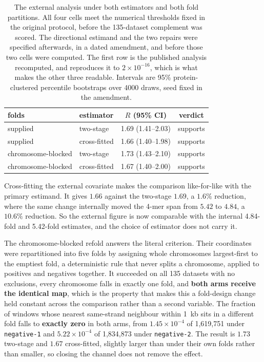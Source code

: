 \begin{table}[htbp]
\centering
\caption{The external analysis under both estimators and both fold partitions. All four cells
meet the numerical thresholds fixed in the original protocol, before the 135-dataset
complement was scored. The directional estimand and the two repairs were specified afterwards,
in a dated amendment, and before those two cells were computed. The first row is the published analysis
recomputed, and reproduces it to $2\times10^{-16}$, which is what makes the other three
readable. Intervals are 95\% protein-clustered percentile bootstraps over 4000 draws, seed
fixed in the amendment.}
\label{tab:extsens}
\begin{tabular}{llcc}
\toprule
folds & estimator & $R$ (95\% CI) & verdict \\
\midrule
supplied & two-stage & 1.69 (1.41--2.03) & supports \\
supplied & cross-fitted & 1.66 (1.40--1.98) & supports \\
chromosome-blocked & two-stage & 1.73 (1.43--2.10) & supports \\
chromosome-blocked & cross-fitted & 1.67 (1.40--2.00) & supports \\
\bottomrule
\end{tabular}
\end{table}

Cross-fitting the external covariate makes the comparison like-for-like with the primary
estimand. It gives $1.66$ against the two-stage $1.69$, a $1.6\%$ reduction, where the same
change internally moved the 4-mer span from $5.42$ to $4.84$, a $10.6\%$ reduction. So the
external figure is now comparable with the internal 4.84-fold and 5.42-fold estimates, and the choice of
estimator does not carry it.

The chromosome-blocked refold answers the literal criterion. Their coordinates were repartitioned
into five folds by assigning whole chromosomes largest-first to the emptiest fold, a
deterministic rule that never splits a chromosome, applied to positives and negatives together.
It succeeded on all 135 datasets with no exclusions, every chromosome falls in exactly one
fold, and \textbf{both arms receive the identical map}, which is the property that makes this a
fold-design change held constant across the comparison rather than a second variable. The
fraction of windows whose nearest same-strand neighbour within 1~kb sits in a different fold
falls to \textbf{exactly zero} in both arms, from $1.45\times10^{-4}$ of 1{,}619{,}751
under \texttt{negative-1} and $5.22\times10^{-4}$ of 1{,}834{,}873 under \texttt{negative-2}.
The result is $1.73$ two-stage and $1.67$ cross-fitted, slightly larger than under their own
folds rather than smaller, so closing the channel does not remove the effect.

